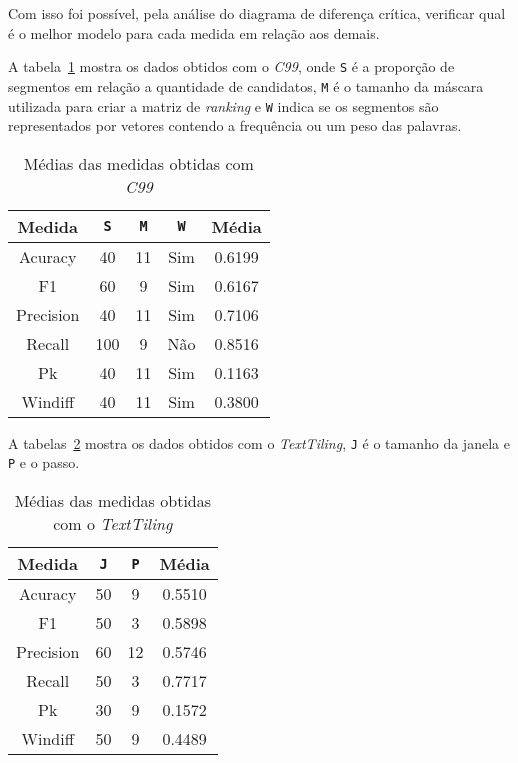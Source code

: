 Com isso foi possível, pela análise do diagrama de diferença crítica, verificar qual é o melhor modelo para cada medida
em relação aos demais. 


A tabela~\ref{tab:mediasC99} mostra os dados obtidos com o \textit{C99}, onde \texttt{S} é a proporção de segmentos em relação a quantidade de candidatos, \texttt{M} é o tamanho da máscara utilizada para criar a matriz de \textit{ranking} e \texttt{W} indica se os segmentos são representados por vetores contendo a frequência ou um peso das palavras. 



\begin{table}[!h]
	\centering

	\begin{tabular}{|c|c|c|c|c|}
	
		\hline
		Medida & \texttt{S} & \texttt{M} & \texttt{W} & \textbf{Média}\\		
		\hline

		Acuracy		& 40	& 11 & Sim & 0.6199	\\ \hline	
		F1			& 60	& 9	 & Sim & 0.6167	\\ \hline	
		Precision	& 40	& 11 & Sim & 0.7106	\\ \hline			
		Recall		& 100	& 9	 & Não & 0.8516	\\ \hline		
		Pk			& 40	& 11 & Sim & 0.1163	\\ \hline	
		Windiff		& 40	& 11 & Sim & 0.3800	\\ \hline		

		
	\end{tabular}
	
	\caption{Médias das medidas obtidas com \textit{C99}}
	\label{tab:mediasC99}
\end{table}


A tabelas~\ref{tab:mediasTextTiling} mostra os dados obtidos com o \textit{TextTiling}, \texttt{J} é o tamanho da janela e \texttt{P} e o passo.

\begin{table}[!h]
	\centering

	\begin{tabular}{|c|c|c|c|}
	
		\hline
		Medida & \texttt{J} & \texttt{P} & \textbf{Média}\\		
		\hline

		Acuracy		& 50 & 9 	& 0.5510 \\ \hline	
		F1			& 50 & 3 	& 0.5898 \\ \hline	
		Precision	& 60 & 12 	& 0.5746 \\ \hline			
		Recall		& 50 & 3 	& 0.7717 \\ \hline		
		Pk			& 30 & 9 	& 0.1572 \\ \hline	
		Windiff		& 50 & 9 	& 0.4489 \\ \hline		

		
	\end{tabular}
	
	\caption{Médias das medidas obtidas com o \textit{TextTiling}}
	\label{tab:mediasTextTiling}
\end{table}



